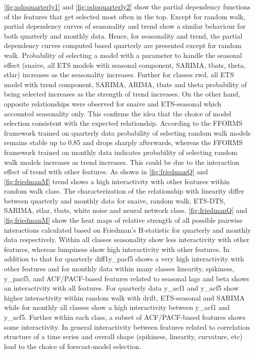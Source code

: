 \documentclass[11pt,a4paper,]{article}
\begin{document}
\autoref{fig:pdpquarterly1} and \autoref{fig:pdpquarterly2} show the
partial dependency functions of the features that get selected most
often in the top. Except for random walk, partial dependency curves of
seasonality and trend show a similar behaviour for both quarterly and
monthly data. Hence, for seasonality and trend, the partial dependency
curves computed based quarterly are presented except for random walk.
Probability of selecting a model with a parameter to handle the seasonal
effect (snaive, all ETS models with seasonal component, SARIMA, tbats,
theta, stlar) increases as the seasonality increases. Further for
classes rwd, all ETS model with trend component, SARIMA, ARIMA, tbats
and theta probability of being selected increases as the strength of
trend increases. On the other hand, opposite relationships were observed
for snaive and ETS-seasonal which accounted seasonality only. This
confirms the idea that the choice of model selection consistent with the
expected relationship. According to the FFORMS framework trained on
quarterly data probability of selecting random walk models remains
stable up to 0.85 and drops sharply afterwards, whereas the FFORMS
framework trained on monthly data indicates probability of selecting
random walk models increases as trend increases. This could be due to
the interaction effect of trend with other features. As shown in
\autoref{fig:friedmanQ} and \autoref{fig:friedmanM} trend shows a high
interactivity with other features within random walk class. The
characterization of the relationship with linearity differ between
quarterly and monthly data for snaive, random walk, ETS-DTS, SARIMA,
stlar, tbats, white noise and neural network class.
\autoref{fig:friedmanQ} and \autoref{fig:friedmanM} show the heat maps
of relative strength of all possible pairwise interactions calculated
based on Friedman's H-statistic for quarterly and monthly data
respectively. Within all classes seasonality show less interactivity
with other features, whereas lumpiness show high interactivity with
other features. In addition to that for quarterly diff1y\_pacf5 shows a
very high interactivity with other features and for monthly data within
many classes linearity, spikiness, y\_pacf5, and ACF/PACF-based features
related to seasonal lags and beta shows an interactivity with all
features. For quarterly data y\_acf1 and y\_acf5 show higher
interactivity within random walk with drift, ETS-seasonal and SARIMA
while for monthly all classes show a high interactivity between y\_acf1
and y\_acf5. Further within each class, a subset of ACF/PACF-based
features shows some interactivity. In general interactivity between
features related to correlation structure of a time series and overall
shape (spikiness, linearity, curvature, etc) lead to the choice of
forecast-model selection.
\end{document}
